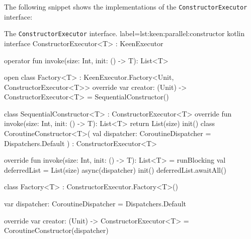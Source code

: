   The following snippet shows the implementations of the 
  \texttt{ConstructorExecutor} interface:

  \begin{code}{The \texttt{ConstructorExecutor} interface.}{
    label={lst:keen:parallel:constructor}
  }{kotlin}
    interface ConstructorExecutor<T> : KeenExecutor {
        operator fun invoke(size: Int, init: () -> T): List<T>

        open class Factory<T> : KeenExecutor.Factory<Unit, ConstructorExecutor<T>> {
            override var creator: (Unit) -> ConstructorExecutor<T> = { SequentialConstructor() }
        }
    }

    class SequentialConstructor<T> : ConstructorExecutor<T> {
        override fun invoke(size: Int, init: () -> T): List<T> {
            return List(size) { init() }
        }
    }
    class CoroutineConstructor<T>(
        val dispatcher: CoroutineDispatcher = Dispatchers.Default
    ) : ConstructorExecutor<T> {
        override fun invoke(size: Int, init: () -> T): List<T> = runBlocking {
            val deferredList = List(size) {
                async(dispatcher) {
                    init()
                }
            }
            deferredList.awaitAll()
        }

        class Factory<T> : ConstructorExecutor.Factory<T>() {
            var dispatcher: CoroutineDispatcher = Dispatchers.Default

            override var creator: (Unit) -> ConstructorExecutor<T> =
                { CoroutineConstructor(dispatcher) }
        }
    }
  \end{code}
